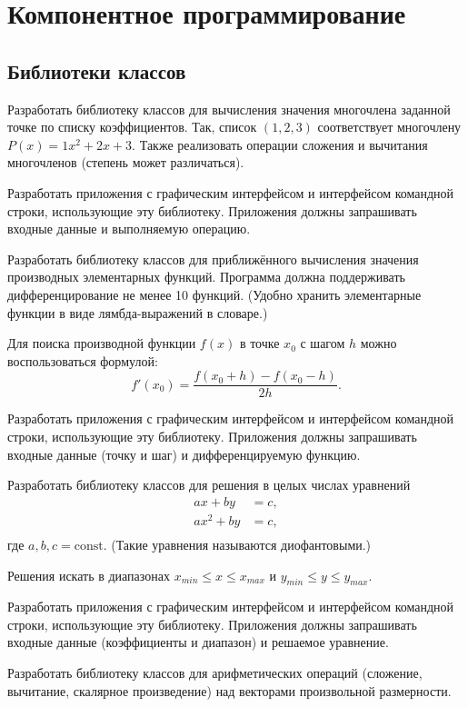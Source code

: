 \section{Компонентное программирование}

\subsection{Библиотеки классов}

\task Разработать библиотеку классов для вычисления значения
многочлена заданной точке по списку коэффициентов. Так, список
$(1, 2, 3)$ соответствует многочлену $P(x)=1x^2+2x+3.$ Также
реализовать операции сложения и вычитания многочленов (степень может
различаться).

Разработать приложения с графическим интерфейсом и интерфейсом
командной строки, использующие эту библиотеку. Приложения должны
запрашивать входные данные и выполняемую операцию.

\task Разработать библиотеку классов для приближённого вычисления
значения производных элементарных функций. Программа должна
поддерживать дифференцирование не менее 10 функций. (Удобно хранить
элементарные функции в виде лямбда-выражений в словаре.)

Для поиска производной функции $f(x)$ в точке $x_0$ с шагом $h$ можно
воспользоваться формулой:
\[
f'(x_0) = \frac{f(x_0+h) - f(x_0-h)}{2h}.
\]

Разработать приложения с графическим интерфейсом и интерфейсом
командной строки, использующие эту библиотеку. Приложения должны
запрашивать входные данные (точку и шаг) и дифференцируемую функцию.

\task Разработать библиотеку классов для решения в целых числах
уравнений
\begin{align*}
a x + b y &= c,\\
a x^2 + b y &= c,\\
\end{align*}
где $a, b, c = \mathrm{const}.$ (Такие уравнения называются
диофантовыми.)

Решения искать в диапазонах $x_{min}\leqslant x \leqslant x_{max}$ и
$y_{min}\leqslant y \leqslant y_{max}.$

Разработать приложения с графическим интерфейсом и интерфейсом
командной строки, использующие эту библиотеку. Приложения должны
запрашивать входные данные (коэффициенты и диапазон) и решаемое
уравнение.

\task Разработать библиотеку классов для арифметических операций
(сложение, вычитание, скалярное произведение) над векторами
произвольной размерности.

